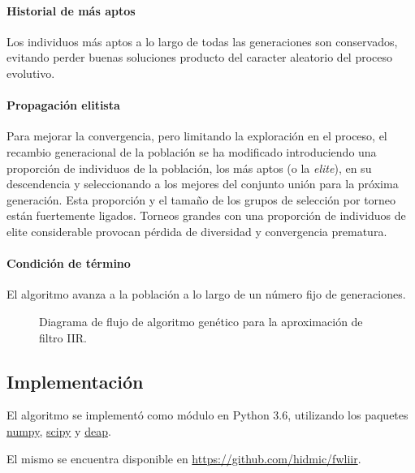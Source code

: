 \documentclass[11pt, journal]{IEEEtran}
\begin{document}
\paragraph{Historial de más aptos}

Los individuos más aptos a lo largo de todas las generaciones son
conservados, evitando perder buenas soluciones producto del caracter
aleatorio del proceso evolutivo.

\paragraph{Propagación elitista}

Para mejorar la convergencia, pero limitando la exploración en el
proceso, el recambio generacional de la población se ha modificado
introduciendo una proporción de individuos de la población, los más
aptos (o la \emph{elite}), en su descendencia y seleccionando a los
mejores del conjunto unión para la próxima generación.
Esta proporción y el tamaño de los grupos de selección por torneo están
fuertemente ligados. Torneos grandes con una proporción de individuos de
elite considerable provocan pérdida de diversidad y convergencia
prematura.

\paragraph{Condición de término}

El algoritmo avanza a la población a lo largo de un número fijo de
generaciones.

\newpage

\begin{figure}
  \centering
  \caption{Diagrama de flujo de algoritmo genético para la aproximación de filtro IIR.}
\end{figure}

\newpage

\subsection{Implementación}

El algoritmo se implementó como módulo en Python 3.6, utilizando los paquetes \href{https://www.numpy.org/}{numpy},
\href{https://scipy.org/}{scipy} y \href{https://deap.readthedocs.io/en/master/}{deap}.

El mismo se encuentra disponible en \href{https://github.com/hidmic/fwliir}{https://github.com/hidmic/fwliir}.
\end{document}
